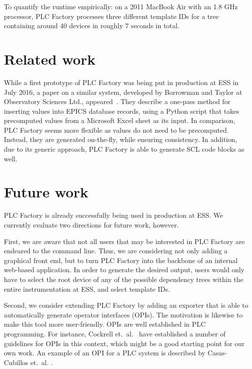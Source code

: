 \documentclass[a4paper,
              ]{jacow}
\begin{document}
To quantify the runtime empirically: on a 2011 MacBook Air with an 1.8 GHz processor, PLC Factory processes three different template IDs for a tree containing around 40 devices in roughly $7$ seconds in total.



\section{Related work}
While a first prototype of PLC Factory was being put in production at ESS in July 2016, a paper on a similar system, developed by Borrowman and Taylor at Observatory Sciences Ltd., appeared~\cite{Borrowman}. They describe a one-pass method for inserting values into EPICS database records, using a Python script that takes precomputed values from a Microsoft Excel sheet as its input. In comparison, PLC Factory seems more flexible as values do not need to be precomputed. Instead, they are generated on-the-fly, while ensuring consistency. In addition, due to its generic approach, PLC Factory is able to generate SCL code blocks as well.



\section{Future work}
PLC Factory is already successfully being used in production at ESS. We currently evaluate two directions for future work, however.

First, we are aware that not all users that may be interested in PLC Factory are endeared to the command line. Thus, we are considering not only adding a graphical front end, but to turn PLC Factory into the backbone of an internal web-based application. In order to generate the desired output, users would only have to select the root device of any of the possible dependency trees within the entire instrumentation at ESS, and select template IDs.

Second, we consider extending PLC Factory by adding an exporter that is able to automatically generate operator interfaces (OPIs). The motivation is likewise to make this tool more user-friendly. OPIs are well established in PLC programming. For instance, Cockrell et.\ al.\ \cite{Cockrell1992} have established a number of guidelines for OPIs in this context, which might be a good starting point for our own work. An example of an OPI for a PLC system is described by Casas-Cubillos et.\ al. \cite{CasasCubillos2002}.
\end{document}
